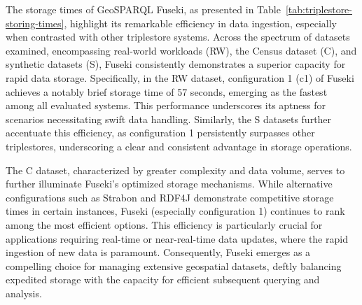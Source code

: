 \begin{table}[ht]
\centering \caption{Storing times (sec.)}
\label{tab:triplestore-storing-times}
\vskip 0.2cm
\end{table}

The storage times of GeoSPARQL Fuseki, as presented in Table~\ref{tab:triplestore-storing-times}, highlight its remarkable efficiency in data ingestion, especially when contrasted with other triplestore systems. Across the spectrum of datasets examined, encompassing real-world workloads (RW), the Census dataset (C), and synthetic datasets (S), Fuseki consistently demonstrates a superior capacity for rapid data storage. Specifically, in the RW dataset, configuration 1 (c1) of Fuseki achieves a notably brief storage time of 57 seconds, emerging as the fastest among all evaluated systems. This performance underscores its aptness for scenarios necessitating swift data handling. Similarly, the S datasets further accentuate this efficiency, as configuration 1 persistently surpasses other triplestores, underscoring a clear and consistent advantage in storage operations. 

The C dataset, characterized by greater complexity and data volume, serves to further illuminate Fuseki’s optimized storage mechanisms. While alternative configurations such as Strabon and RDF4J demonstrate competitive storage times in certain instances, Fuseki (especially configuration 1) continues to rank among the most efficient options. This efficiency is particularly crucial for applications requiring real-time or near-real-time data updates, where the rapid ingestion of new data is paramount. Consequently, Fuseki emerges as a compelling choice for managing extensive geospatial datasets, deftly balancing expedited storage with the capacity for efficient subsequent querying and analysis. 





